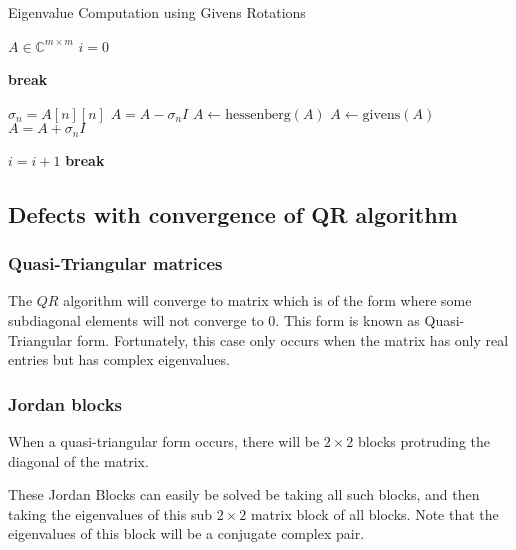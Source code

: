 \documentclass[12pt]{article}
\numberwithin{equation}{section}
\newcommand{\defmat}[2]{#1\in\mathbb{C}^{#2\times#2}}
\newcommand{\abs}[1]{\left\vert#1\right\vert}
\begin{document}
\begin{algorithm}
\caption{Eigenvalue Computation using Givens Rotations}
\begin{algorithmic}[1]
\State $\defmat{A}{m}$
\State $i = 0$

            \State \textbf{break}
        \EndIf

        \State $\sigma_n = A[n][n]$
        \State $A = A - \sigma_n I$ 
        \State $A \gets \text{hessenberg}(A)$ 
        \State $A \gets \text{givens}(A)$ 
        \State $A = A + \sigma_n I$ 

        \State $i = i + 1$
        \If{$\abs{A[n][n-1]} = 0$}
            \State \textbf{break}
        \EndIf
    \EndWhile
\EndFor
\end{algorithmic}
\end{algorithm}

\subsection{Defects with convergence of QR algorithm}
\subsubsection{Quasi-Triangular matrices}
The $QR$ algorithm will converge to matrix which is of the form where some subdiagonal elements will not converge to 0. This form is known as Quasi-Triangular form.
Fortunately, this case only occurs when the matrix has only real entries but has complex eigenvalues. 
\subsubsection{Jordan blocks}
When a quasi-triangular form occurs, there will be $2\times2$ blocks protruding the diagonal of the matrix. 

\begin{center}
\end{center}
These Jordan Blocks can easily be solved be taking all such blocks, and then taking the eigenvalues of this sub $2\times 2$ matrix block of all blocks.
Note that the eigenvalues of this block will be a conjugate complex pair.
\end{document}
